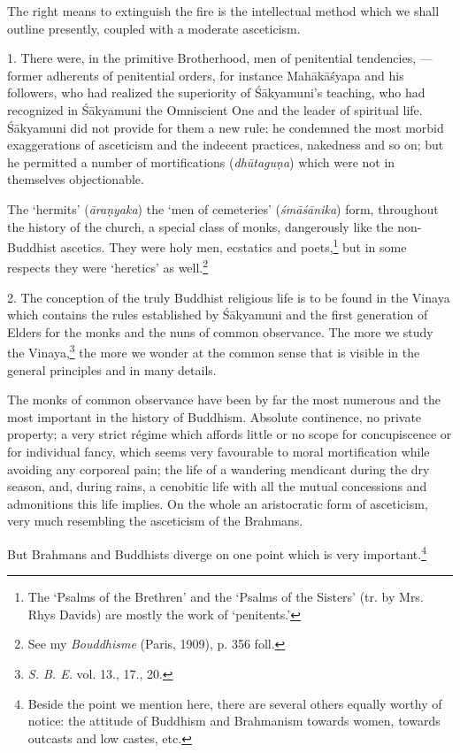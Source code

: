 \documentclass[a4paper, 11pt, oneside, english]{article}
\begin{document}
The right means to extinguish the fire is the intellectual method which we shall outline presently, coupled with a moderate asceticism.

1. There were, in the primitive Brotherhood, men of penitential tendencies, --- former adherents of penitential orders, for instance Mahākāśyapa and his followers, who had realized the superiority of Śākyamuni's teaching, who had recognized in Śākyamuni the Omniscient One and the leader of spiritual life. Śākyamuni did not provide for them a new rule: he condemned the most morbid exaggerations of asceticism and the indecent practices, nakedness and so on; but he permitted a number of mortifications (\emph{dhūtaguṇa}) which were not in themselves objectionable.

The `hermits' (\emph{āraṇyaka}) the `men of cemeteries' (\emph{śmāśānika}) form, throughout the history of the church, a special class of monks, dangerously like the non-Buddhist ascetics. They were holy men, ecstatics and poets,\footnote{The `Psalms of the Brethren' and the `Psalms of the Sisters' (tr. by Mrs. Rhys Davids) are mostly the work of `penitents.'} but in some respects they were `heretics' as well.\footnote{See my \emph{Bouddhisme} (Paris, 1909), p. 356 foll.}

2. The conception of the truly Buddhist religious life is to be found in the Vinaya which contains the rules established by Śākyamuni and the first generation of Elders for the monks and the nuns of common observance. The more we study the Vinaya,\footnote{\emph{S. B. E.} vol. 13., 17., 20.} the more we wonder at the common sense that is visible in the general principles and in many details.

The monks of common observance have been by far the most numerous and the most important in the history of Buddhism. Absolute continence, no private property; a very strict régime which affords little or no scope for concupiscence or for individual fancy, which seems very favourable to moral mortification while avoiding any corporeal pain; the life of a wandering mendicant during the dry season, and, during rains, a cenobitic life with all the mutual concessions and admonitions this life implies. On the whole an aristocratic form of asceticism, very much resembling the asceticism of the Brahmans.

But Brahmans and Buddhists diverge on one point which is very important.\footnote{Beside the point we mention here, there are several others equally worthy of notice: the attitude of Buddhism and Brahmanism towards women, towards outcasts and low castes, etc.}
\end{document}

